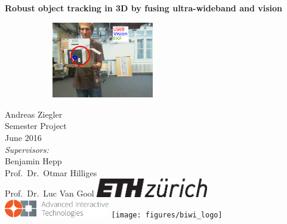 \documentclass[a4paper,twoside,12pt,nochapterprefix]{scrbook}
\begin{document}
\begin{titlepage}
	\topmargin 1.0cm
	\oddsidemargin 0.0cm
	\evensidemargin 0.0cm
	\centering
	\Huge
	\vspace{3.0cm}
	\textbf{\textsf{Robust object tracking in 3D by fusing ultra-wideband and vision}} \\[2.0cm]
	
	\begin{figure}[ht!]
		\centering
		\begin{subfigure}{} %
		\end{subfigure}
		\hfill
		\begin{subfigure}{}
			\centering
			\includegraphics*[width=0.487\textwidth]{figures/2d_output} %
		\end{subfigure}
	\end{figure}
	
	\vspace{3cm}
	\sffamily
	\Large
	Andreas Ziegler
	\\[0.8cm]
	\large
	Semester Project %
	\\
	June 2016
	\\[1.3cm]
	\emph{Supervisors:}\\
	Benjamin Hepp\\ 					%
	Prof.\ Dr.\ Otmar Hilliges\\		%
	Prof.\ Dr.\ Luc Van Gool
	\vfill
	\includegraphics*[height=0.8cm]{figures/eth_logo_kurz_pos.eps} \hfill
	\includegraphics*[height=0.8cm]{figures/logo-ait} \hfill
	\texttt{[image: figures/biwi\_logo]}
	\vspace{3.4cm}
\end{titlepage}
\clearemptydoublepage
\end{document}
